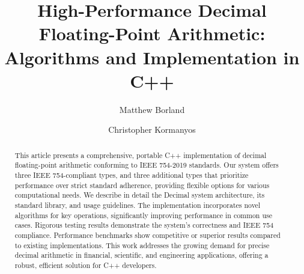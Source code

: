 \documentclass[acmsmall]{acmart}
\begin{document}
\title{High-Performance Decimal Floating-Point Arithmetic: Algorithms and Implementation in C++}

\author{Matthew Borland}
\author{Christopher Kormanyos}
\authornotemark[1]

\renewcommand{\shortauthors}{Borland and Kormanyos}

\begin{abstract}
  This article presents a comprehensive, portable C++ implementation of decimal floating-point arithmetic conforming to IEEE 754-2019 standards\cite{ieee754-2019}. 
  Our system offers three IEEE 754-compliant types, and three additional types that prioritize performance over strict standard adherence, providing flexible options for various computational needs. 
  We describe in detail the Decimal system architecture, its standard library, and usage guidelines. 
  The implementation incorporates novel algorithms for key operations, significantly improving performance in common use cases. 
  Rigorous testing results demonstrate the system's correctness and IEEE 754 compliance. 
  Performance benchmarks show competitive or superior results compared to existing implementations. 
  This work addresses the growing demand for precise decimal arithmetic in financial, scientific, and engineering applications, offering a robust, efficient solution for C++ developers.
\end{abstract}
\end{document}
